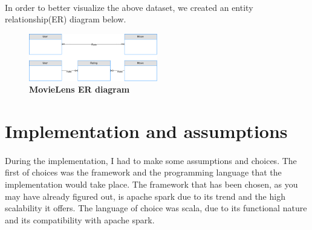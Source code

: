 \paragraph{} In order to better visualize the above dataset, we created an entity relationship(ER) diagram below. \\
\begin{figure}[ht]
	\centering
	\includegraphics[width=0.5\textwidth]{../images/MovieLensDataset.png}
	\caption{\bfseries MovieLens ER diagram \cite{MovieLens:3}}
	\label{movieLensER}
\end{figure}


\section{Implementation and assumptions}
\paragraph{}During the implementation, I had to make some assumptions and choices. The first of choices was the framework and the programming language that the implementation would take place. The framework that has been chosen, as you may have already figured out, is apache spark due to its trend and the high scalability it offers. The language of choice was scala, due to its functional nature and its compatibility with apache spark.
